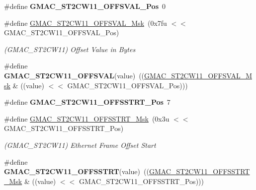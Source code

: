 \begin{DoxyCompactItemize}
\item 
\mbox{\label{group__SAME70__GMAC_ga345797e545ae278cbc271ec3f1deb849}} 
\#define {\bfseries G\+M\+A\+C\+\_\+\+S\+T2\+C\+W11\+\_\+\+O\+F\+F\+S\+V\+A\+L\+\_\+\+Pos}~0
\item 
\mbox{\label{group__SAME70__GMAC_ga1fdc32a18e762e636fc3d07b0e8bb32b}} 
\#define \mbox{\hyperlink{group__SAME70__GMAC_ga1fdc32a18e762e636fc3d07b0e8bb32b}{G\+M\+A\+C\+\_\+\+S\+T2\+C\+W11\+\_\+\+O\+F\+F\+S\+V\+A\+L\+\_\+\+Msk}}~(0x7fu $<$$<$ G\+M\+A\+C\+\_\+\+S\+T2\+C\+W11\+\_\+\+O\+F\+F\+S\+V\+A\+L\+\_\+\+Pos)
\begin{DoxyCompactList}\small\item\em (G\+M\+A\+C\+\_\+\+S\+T2\+C\+W11) Offset Value in Bytes \end{DoxyCompactList}\item 
\mbox{\label{group__SAME70__GMAC_ga0dc43fec2eee731ef023f6cecd7ece55}} 
\#define {\bfseries G\+M\+A\+C\+\_\+\+S\+T2\+C\+W11\+\_\+\+O\+F\+F\+S\+V\+AL}(value)~((\mbox{\hyperlink{group__SAMV71__GMAC_ga1fdc32a18e762e636fc3d07b0e8bb32b}{G\+M\+A\+C\+\_\+\+S\+T2\+C\+W11\+\_\+\+O\+F\+F\+S\+V\+A\+L\+\_\+\+Msk}} \& ((value) $<$$<$ G\+M\+A\+C\+\_\+\+S\+T2\+C\+W11\+\_\+\+O\+F\+F\+S\+V\+A\+L\+\_\+\+Pos)))
\item 
\mbox{\label{group__SAME70__GMAC_ga4c425aa9dd4520c26fc43de99863c5ec}} 
\#define {\bfseries G\+M\+A\+C\+\_\+\+S\+T2\+C\+W11\+\_\+\+O\+F\+F\+S\+S\+T\+R\+T\+\_\+\+Pos}~7
\item 
\mbox{\label{group__SAME70__GMAC_gac424382123f6ce476dea308b4a6ffdd9}} 
\#define \mbox{\hyperlink{group__SAME70__GMAC_gac424382123f6ce476dea308b4a6ffdd9}{G\+M\+A\+C\+\_\+\+S\+T2\+C\+W11\+\_\+\+O\+F\+F\+S\+S\+T\+R\+T\+\_\+\+Msk}}~(0x3u $<$$<$ G\+M\+A\+C\+\_\+\+S\+T2\+C\+W11\+\_\+\+O\+F\+F\+S\+S\+T\+R\+T\+\_\+\+Pos)
\begin{DoxyCompactList}\small\item\em (G\+M\+A\+C\+\_\+\+S\+T2\+C\+W11) Ethernet Frame Offset Start \end{DoxyCompactList}\item 
\mbox{\label{group__SAME70__GMAC_gabb652fe56b38ef037700a3026e68d37d}} 
\#define {\bfseries G\+M\+A\+C\+\_\+\+S\+T2\+C\+W11\+\_\+\+O\+F\+F\+S\+S\+T\+RT}(value)~((\mbox{\hyperlink{group__SAMV71__GMAC_gac424382123f6ce476dea308b4a6ffdd9}{G\+M\+A\+C\+\_\+\+S\+T2\+C\+W11\+\_\+\+O\+F\+F\+S\+S\+T\+R\+T\+\_\+\+Msk}} \& ((value) $<$$<$ G\+M\+A\+C\+\_\+\+S\+T2\+C\+W11\+\_\+\+O\+F\+F\+S\+S\+T\+R\+T\+\_\+\+Pos)))

\end{DoxyCompactItemize}
